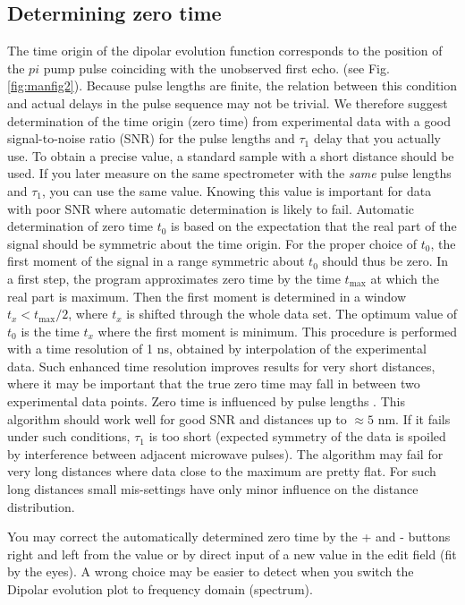 \documentclass{article}
\begin{document}
\subsection{Determining zero time}
The time origin of the dipolar evolution function corresponds to the position of the $pi$ pump pulse coinciding with the unobserved first echo. (see
Fig. \ref{fig:manfig2}). Because pulse lengths are finite, the relation between this condition and actual delays in the pulse sequence may not be trivial. We therefore suggest
determination of the time origin (zero time) from experimental data with a good
signal-to-noise ratio (SNR) for the pulse lengths and $\tau_1$ delay that you actually
use. To obtain a precise value, a standard sample with a short distance should be used. If you later measure on the same spectrometer with the \emph{same} pulse lengths
and $\tau_1$, you can use the same value. Knowing this value is important for data
with poor SNR where automatic determination is likely to fail.
Automatic determination of zero time $t_0$ is based on the expectation that
the real part of the signal should be symmetric about the time origin. For the
proper choice of $t_0$, the first moment of the signal in a range symmetric about
$t_0$ should thus be zero. In a first step, the program approximates zero time by
the time $t_{\mathrm{max}}$ at which the real part is maximum. Then the first moment is
determined in a window $t_x<t_{\mathrm{max}}/2$, where $t_x$ is shifted through the whole data
set. The optimum value of $t_0$ is the time $t_x$ where the first moment is minimum. This procedure is performed with a time resolution of 1 ns, obtained by interpolation of the experimental data. Such enhanced time resolution improves results for very short distances, where it may be important that the true zero time may fall in between two experimental data points. Zero time is influenced by pulse lengths \cite{maryasov2000,milov2004}. This
algorithm should work well for good SNR and distances up to $\approx5$ nm. If it fails
under such conditions, $\tau_1$ is too short (expected symmetry of the data is spoiled
by interference between adjacent microwave pulses). The algorithm may fail
for very long distances where data close to the maximum are pretty flat. For
such long distances small mis-settings have only minor influence on the distance
distribution.

You may correct the automatically determined zero time by the {\ttfamily +} and {\ttfamily -}
buttons right and left from the value or by direct input of a new value in the edit field
(fit by the eyes). A wrong choice may be easier to detect when you switch
the {\ttfamily Dipolar evolution} plot to frequency domain ({\ttfamily spectrum}).
\end{document}
